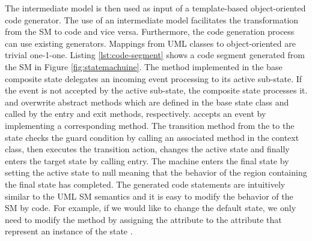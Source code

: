 The intermediate model is then used as input of a template-based object-oriented code generator. The use of an intermediate model facilitates the transformation from the SM to code and vice versa. Furthermore, the code generation process can use existing generators. Mappings from UML classes to object-oriented are trivial one-1-one. Listing \ref{lst:code-segment} shows a code segment generated from the SM in Figure \ref{fig:statemachuine}. The  method implemented in the base composite state delegates an incoming event processing to its active sub-state. If the event is not accepted by the active sub-state, the composite state processes it.  and  overwrite abstract methods which are defined in the base state class and called by the entry and exit methods, respectively.  accepts an  event by implementing a corresponding  method. The transition method from the  to the  state checks the guard condition by calling an associated method in the context class, then executes the transition action, changes the active state and finally enters the target state by calling entry. The machine enters the final state by setting the active state to null meaning that the behavior of the region containing the final state has completed. The generated code statements are intuitively similar to the UML SM semantics and it is easy to modify the behavior of the SM by code. For example, if we would like to change the default state, we only need to modify the  method by assigning the attribute  to the attribute  that represent an instance of the state .

